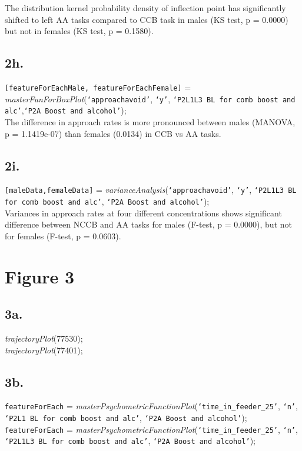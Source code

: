 \documentclass{article}
\begin{document}
The distribution kernel probability density of inflection point has significantly shifted to left AA tasks compared to CCB task in males (KS test, p = 0.0000) but not in females (KS test, p = 0.1580).

\subsection{2h.}
\texttt{[featureForEachMale, featureForEachFemale]} = \emph{masterFunForBoxPlot}(\texttt{`approachavoid'}, \texttt{`y'}, \texttt{`P2L1L3 BL for comb boost and alc'},\texttt{`P2A Boost and alcohol'});\\

The difference in approach rates is more pronounced between males (MANOVA, p = 1.1419e-07) than females (0.0134) in CCB vs AA tasks.

\subsection{2i.}
\texttt{[maleData,femaleData]} = \emph{varianceAnalysis}(\texttt{`approachavoid'}, \texttt{`y'}, \texttt{`P2L1L3 BL for comb boost and alc'}, \texttt{`P2A Boost and alcohol'});\\

Variances in approach rates at four different concentrations shows significant difference between NCCB and AA tasks for males (F-test, p = 0.0000), but not for females (F-test, p = 0.0603).


\section{Figure 3}
\subsection{3a.}
\emph{trajectoryPlot}(77530);\\
\emph{trajectoryPlot}(77401);\\

\subsection{3b.}
\texttt{featureForEach} = \emph{masterPsychometricFunctionPlot}(\texttt{`time\_in\_feeder\_25'}, \texttt{`n'}, \texttt{`P2L1 BL for comb boost and alc'}, \texttt{`P2A Boost and alcohol'});\\
\texttt{featureForEach} = \emph{masterPsychometricFunctionPlot}(\texttt{`time\_in\_feeder\_25'}, \texttt{`n'}, \texttt{`P2L1L3 BL for comb boost and alc'}, \texttt{`P2A Boost and alcohol'});\\
\end{document}
